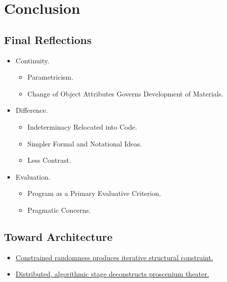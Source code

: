 \documentclass{beamer}
\begin{document}
\section{Conclusion}

\subsection{Final Reflections}
\begin{frame}
\begin{itemize}
	\item{Continuity.}

		\begin{itemize}
		\item<2->
		Parametricism.
		\item<3->
		Change of Object Attributes Governs Development of Materials.
		\end{itemize}
	\item{Difference.}
		\begin{itemize}
		\item<4->
		Indeterminacy Relocated into Code.
		\item<5->
		Simpler Formal and Notational Ideas.
		\item<6->
		Less Contrast.
		\end{itemize}
	\item{Evaluation.}
		\begin{itemize}
		\item<7->
		Program as a Primary Evaluative Criterion.
		\item<8->
		Pragmatic Concerns.
		\end{itemize}
	
\end{itemize}
\end{frame}
\subsection{Toward Architecture}
\begin{frame}
	\begin{itemize}
		\item{\href{stage1}{Constrained randomness produces iterative structural constraint.}}
		\pause
		\item{\href{stage2}{Distributed, algorithmic stage deconstructs proscenium theater.}}
	\end{itemize}
\end{frame}
\end{document}
